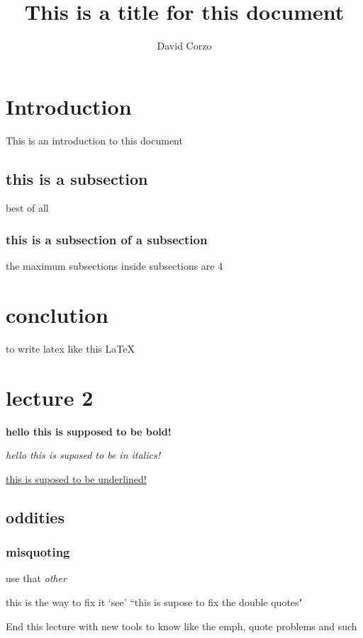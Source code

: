 \documentclass[12 pt]{article}
\title{This is a title for this document}
\author{David Corzo}
\begin{document}
 


\maketitle

\section{Introduction}
This is an introduction to this document
\subsection{this is a subsection}
best of all 
\subsubsection{this is a subsection of a subsection}
the maximum subsections inside subsections are 4
\section{conclution}
to write latex like this \LaTeX


\section{lecture 2}

\noindent

\textbf{hello this is supposed to be bold!}

\emph{hello this is suposed to be in italics!}

\underline{this is suposed to be underlined!}

\subsection{oddities}

\subsubsection{misquoting}
\noindent use that \emph{other}

\noindent this is the way to fix it `see' ``this is supose to fix the double quotes"

\noindent End this lecture with new tools to know like the emph, quote problems and such
\end{document}
